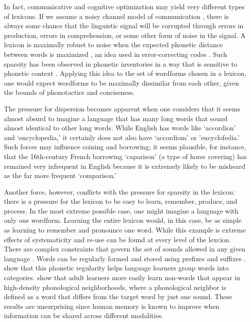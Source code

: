 \documentclass{article}
\begin{document}
In fact, communicative and cognitive optimization may yield very different types of lexicons. If we assume a
noisy channel model of communication \citep{shannon_mathematical_2001,
levy_expectation-based_2008,gibson2013noisy}, there is always some chance that the linguistic signal will be
corrupted through errors in production, errors in comprehension, or some other form of noise in the signal. A
lexicon is maximally robust to noise when the expected phonetic distance between words is maximized
\citep{flemming_contrast_2004, graff_2012}, an idea used in error-correcting codes
\citep{shannon1948mathematical}. Such sparsity has been observed in phonetic inventories
\citep{hockett1955manual,flemming2002auditory} in a way that is sensitive to phonetic context
\citep{steriade1997phonetics,steriade2001directional}. Applying this idea to the set of wordforms chosen in a
lexicon, one would expect wordforms to be maximally dissimilar from each other, given the bounds of
phonotactics and conciseness.

The pressure for dispersion becomes apparent when one considers that it seems almost absurd to imagine a
language that has many long words that sound almost identical to other long words. While English has words
like `accordion' and `encyclopedia,' it certainly does not also have `accordiom' or 'encyclofedia.' Such
forces may influence coining and borrowing; it seems plausible, for instance, that the 16th-century French
borrowing `caparison' (a type of horse covering) has remained very infrequent in English because it is
extremely likely to be misheard as the far more frequent `comparison.'

Another force, however, conflicts with the pressure for sparsity in the lexicon: there is a pressure for the
lexicon to be easy to learn, remember, produce, and process. In the most extreme possible case, one might
imagine a language with only one wordform. Learning the entire lexicon would, in this case, be as simple as
learning to remember and pronounce one word. While this example is extreme effects of systematicity and re-use
can be found at every level of the lexcion. There are complex constraints that govern the set of sounds
allowed in any given language \citep{hayes_blick_2012}. Words can be regularly formed and stored using
prefixes and suffixes \citep{odonnell_productivity_2011}. \cite{monaghan_arbitrariness_2011} show that this
phonetic regularity helps language learners group words into categories. \cite{storkel_differentiating_2006}
show that adult learners more easily learn non-words that appear in high-density phonological neighborhoods,
where a phonological neighbor is defined as a word that differs from the target word by just one sound. These
results are unsurprising since human memory is known to improve when information can be shared across
different modalities.
\end{document}
